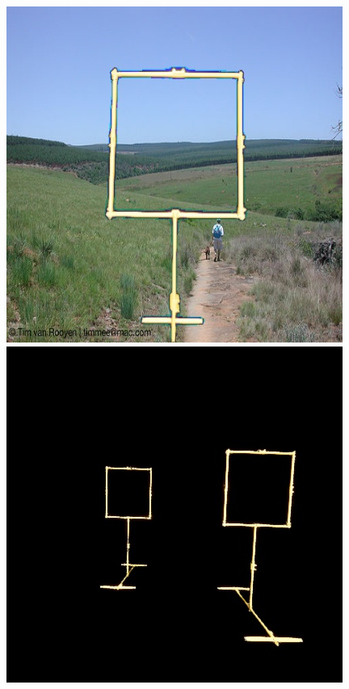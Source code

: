 \begin{figure}[hbtp]
	\centering
	\begin{minipage}{0.3\textwidth}
		\includegraphics[width=\textwidth]{fig/voc}
	\end{minipage}
	\begin{minipage}{0.3\textwidth}
	\includegraphics[width=\textwidth]{fig/void}

\end{minipage}
\end{figure}
